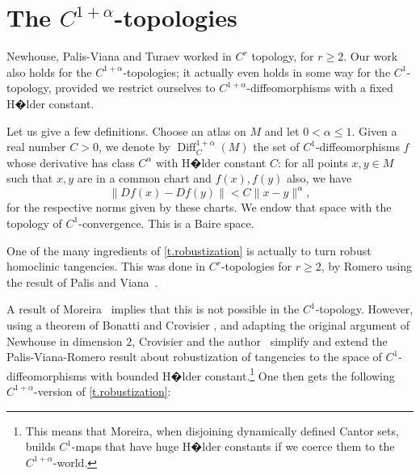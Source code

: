 \documentclass[11pt, a4paper]{amsart}
\theoremstyle{plain}
\theoremstyle{definition}
\theoremstyle{remark}
\numberwithin{equation}{section}         %
\DeclareMathOperator{\Diff}{{Diff}}
\def\Diff{\operatorname{Diff}}
\begin{document}
\section{The $C^{1+\alpha}$-topologies}\label{s.C1alpha}
Newhouse, Palis-Viana and Turaev worked in $C^r$ topology, for $r\geq 2$. Our work also holds for the $C^{1+\alpha}$-topologies; it actually even holds in some way for the $C^1$-topology, provided we restrict ourselves to $C^{1+\alpha}$-diffeomorphisms with a fixed H�lder constant.


Let us give a few definitions.
Choose an atlas on $M$ and let $0<\alpha\leq 1$. Given a real number $C>0$, we denote by $\Diff^{1+\alpha}_C(M)$ the set of $C^1$-diffeomorphisms $f$ whose derivative has class $C^\alpha$ with H�lder constant $C$: for all points $x,y\in M$ such that $x,y$ are in a common chart and $f(x),f(y)$ also, we have
$$\|Df(x)-Df(y)\|<C\|x-y\|^\alpha,$$
for the respective norms given by these charts.
We endow that space with the topology of  $C^1$-convergence. This is a Baire space.

One of the many ingredients of \cref{t.robustization} is actually to turn robust homoclinic tangencies. This was done in $C^r$-topologies for $r\geq 2$, by Romero \cite{Ro} using the result of Palis and Viana~\cite{PV}. 

A result of Moreira~\cite{Mo} implies that this is not possible in the $C^1$-topology.
However, using a theorem of Bonatti and Crovisier \cite{BC2}, and adapting the original argument of Newhouse in dimension $2$, Crovisier and the author~\cite{CG} simplify and extend the Palis-Viana-Romero result about robustization of tangencies  to the space of $C^1$-diffeomorphisms with bounded H�lder constant.\footnote{This means that Moreira, when disjoining dynamically defined Cantor sets, builds $C^1$-maps that have huge H�lder constants if we coerce them to the $C^{1+\alpha}$-world.}
One then gets the following $C^{1+\alpha}$-version of  \cref{t.robustization}:
%
%
\end{document}
